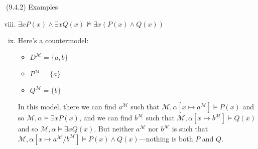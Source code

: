\begin{frame}{(9.4.2) Examples}

\begin{enumerate}[(i)]

\setcounter{enumi}{7}

\item $\exists xP(x)\land \exists x Q(x)\nvDash \exists x(P(x)\land Q(x))$ 
		
		\item[] Here's a countermodel:
		
		\begin{itemize}
		
			\item $D^\mathcal{M}=\{a,b\}$
			
			\item $P^\mathcal{M}=\{a\}$
			\item $Q^\mathcal{M}=\{b\}$
		
		\end{itemize}
		
		In this model, there we can find $a^\mathcal{M}$ such that $\mathcal{M},\alpha[x\mapsto a^\mathcal{M}]\vDash P(x)$ and so $\mathcal{M},\alpha\vDash\exists x P(x)$, and we can find $b^\mathcal{M}$ such that $\mathcal{M},\alpha[x\mapsto b^\mathcal{M}]\vDash Q(x)$ and so $\mathcal{M},\alpha\vDash\exists x Q(x)$. But neither $a^\mathcal{M}$ nor $b^\mathcal{M}$ is such that $\mathcal{M},\alpha[x\mapsto a^\mathcal{M}/b^\mathcal{M}]\vDash P(x)\land Q(x)$---nothing is both $P$ and $Q$.
		
		\end{enumerate}

\end{frame}


